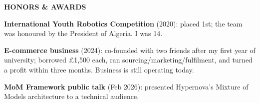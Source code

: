 \documentclass[a4paper,10pt]{article}
\newcommand{\cvsection}[1]{%
  \vspace{7pt}%
  {\bfseries\fontsize{11}{13}\selectfont\MakeUppercase{#1}}\par
  \vspace{1.5pt}{\color{black!75}\hrule height 0.6pt}\vspace{4pt}%
}
\newenvironment{tight}{%
  \begin{list}{\textbullet}{%
    \setlength{\leftmargin}{1.35em}\setlength{\labelsep}{0.5em}%
    \setlength{\itemsep}{1.0pt}\setlength{\parsep}{0pt}\setlength{\topsep}{2.5pt}%
    \setlength{\partopsep}{0pt}}%
}{\end{list}}
\begin{document}
\cvsection{Honors \& Awards}
\begin{tight}
  \item \textbf{International Youth Robotics Competition} (2020): placed 1st; the team was honoured by the President of Algeria. I was 14.
  \item \textbf{E-commerce business} (2024): co-founded with two friends after my first year of university; borrowed £1,500 each, ran sourcing/marketing/fulfilment, and turned a profit within three months. Business is still operating today.
  \item \textbf{MoM Framework public talk} (Feb 2026): presented Hypernova's Mixture of Models architecture to a technical audience.
\end{tight}
\end{document}
